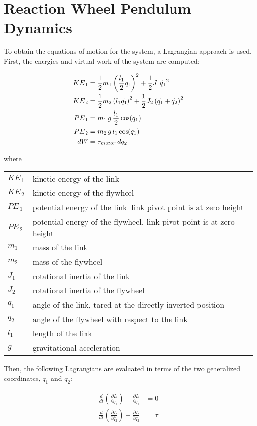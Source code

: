 \documentclass[12pt]{article}
\makeatletter
\newenvironment{conditions}
  {\par\vspace{\abovedisplayskip}\noindent\begin{tabular}{>{$}l<{$} @{${}={}$} l}}
  {\end{tabular}\par\vspace{\belowdisplayskip}}
\makeatother
\begin{document}
\section*{Reaction Wheel Pendulum Dynamics}
To obtain the equations of motion for the system, a Lagrangian approach is used.  First, the energies and virtual work of the system are computed:

\begin{align*}
	KE_{\,1} &= \frac{1}{2}m_1\left(\frac{l_1}{2}\dot{q_1}\right)^2 + \frac{1}{2}J_1\dot{q_1}^2 \\
	KE_{\,2} &= \frac{1}{2}m_2\left(l_1\dot{q_1}\right)^2 + \frac{1}{2}J_2\left(\dot{q_1}+ \dot{q_2}\right)^2\\
	\bigskip\bigskip\bigskip
	PE_{\,1} &= m_1\,g\,\frac{l_1}{2}\,\text{cos}(q_1) \\
	PE_{\,2} &= m_2\,g\,l_1\,\text{cos}(q_1) \\
	dW &= \tau_{motor}\,dq_2
\end{align*}

where
\bigskip

\begin{conditions}
KE_{\,1} & kinetic energy of the link \\
KE_{\,2} & kinetic energy of the flywheel \\
PE_{\,1} & potential energy of the link, link pivot point is at zero height\\
PE_{\,2} & potential energy of the flywheel, link pivot point is at zero height \\
m_1 & mass of the link \\
m_2 & mass of the flywheel \\
J_1 & rotational inertia of the link \\
J_2 & rotational inertia of the flywheel \\
q_1 & angle of the link, tared at the directly inverted position \\
q_2 & angle of the flywheel with respect to the link \\
l_1 & length of the link \\
g & gravitational acceleration \\


\end{conditions}


\bigskip Then, the following Lagrangians are evaluated in terms of the two generalized coordinates, $q_1$ and $q_2$:

\begin{align*}
	\frac{d}{dt} \left( \frac{\partial L}{\partial \dot{q_1}}\right) - \frac{\partial L}{\partial q_1} &= 0  \\
	\frac{d}{dt} \left( \frac{\partial L}{\partial \dot{q_2}}\right) - \frac{\partial L}{\partial q_2} &= \tau 
\end{align*}
\end{document}
